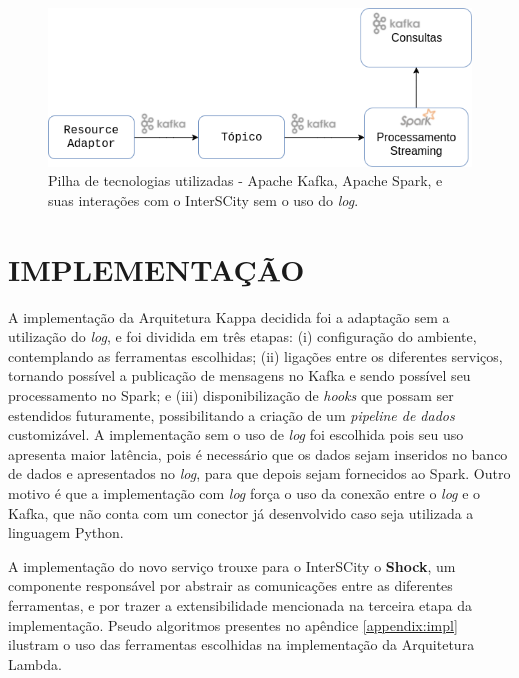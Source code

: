\begin{figure}
  \centering
    \includegraphics[scale=0.5]{figuras/kappa_tools2.png}
  \caption{Pilha de tecnologias utilizadas - Apache Kafka, Apache Spark, e suas
    interações com o InterSCity sem o uso do \textit{log}.}
  \label{fig:stack2}
\end{figure}

\section{IMPLEMENTAÇÃO}

A implementação da Arquitetura Kappa decidida foi a adaptação sem a utilização
do \textit{log}, e foi dividida em três etapas: (i) configuração do ambiente,
contemplando as ferramentas escolhidas; (ii) ligações entre os diferentes
serviços, tornando possível a publicação de mensagens no Kafka e sendo possível
seu processamento no Spark; e (iii) disponibilização de \textit{hooks} que
possam ser estendidos futuramente, possibilitando a criação de um
\textit{pipeline de dados} customizável. A implementação sem o uso de
\textit{log} foi escolhida pois seu uso apresenta maior latência, pois é
necessário que os dados sejam inseridos no banco de dados e apresentados no
\textit{log}, para que depois sejam fornecidos ao Spark. Outro motivo é que
a implementação com \textit{log} força o uso da conexão entre o \textit{log} e
o Kafka, que não conta com um conector já desenvolvido caso seja utilizada a
linguagem Python.

A implementação do novo serviço trouxe para o InterSCity o \textbf{Shock},
um componente responsável por abstrair as comunicações entre as diferentes
ferramentas, e por trazer a extensibilidade mencionada na terceira etapa da
implementação. Pseudo algoritmos presentes no apêndice \ref{appendix:impl}
ilustram o uso das ferramentas escolhidas na implementação da Arquitetura
Lambda.

